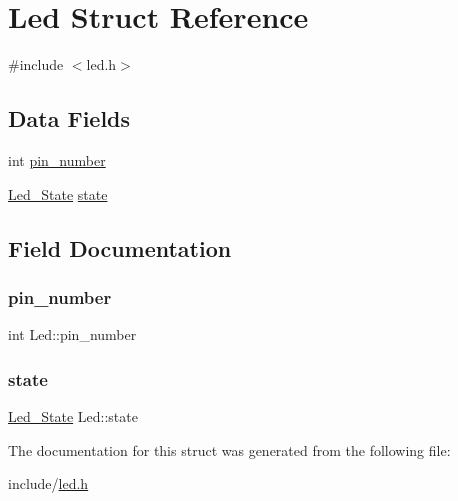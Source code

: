 \hypertarget{structLed}{}\section{Led Struct Reference}
\label{structLed}


{\ttfamily \#include $<$led.\+h$>$}

\subsection*{Data Fields}
\begin{DoxyCompactItemize}
\item 
int \mbox{\hyperlink{structLed_a8829444710298bb97fb920a42e9b33b0}{pin\+\_\+number}}
\item 
\mbox{\hyperlink{led_8h_a0b3e708a23789547325388652a07cc6a}{Led\+\_\+\+State}} \mbox{\hyperlink{structLed_a06ca8144f0c60cd7f6fa4733fed5006e}{state}}
\end{DoxyCompactItemize}


\subsection{Field Documentation}
\mbox{\label{structLed_a8829444710298bb97fb920a42e9b33b0}} 
\subsubsection{\texorpdfstring{pin\+\_\+number}{pin\_number}}
{\footnotesize\ttfamily int Led\+::pin\+\_\+number}

\mbox{\label{structLed_a06ca8144f0c60cd7f6fa4733fed5006e}} 
\subsubsection{\texorpdfstring{state}{state}}
{\footnotesize\ttfamily \mbox{\hyperlink{led_8h_a0b3e708a23789547325388652a07cc6a}{Led\+\_\+\+State}} Led\+::state}



The documentation for this struct was generated from the following file\+:\begin{DoxyCompactItemize}
\item 
include/\mbox{\hyperlink{led_8h}{led.\+h}}\end{DoxyCompactItemize}
